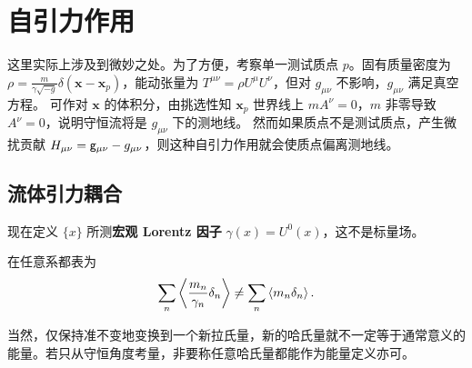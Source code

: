 \chapter{自引力作用}
这里实际上涉及到微妙之处。为了方便，考察单一测试质点 $p$。固有质量密度为 $\rho=\frac{m}{\gamma\sqrt{-g}}\delta(\bm x-\bm x_p)$，能动张量为 $T^{\mu\nu}=\rho U^\mu U^\nu$，但对 $g_{\mu\nu}$ 不影响，$g_{\mu\nu}$ 满足真空方程。
可作对 $\bm x$ 的体积分，由挑选性知 $\bm x_p$ 世界线上 $m A^\nu=0$，$m$ 非零导致 $A^\nu=0$，说明守恒流将是 $g_{\mu\nu}$ 下的测地线。
然而如果质点不是测试质点，产生微扰贡献 $H_{\mu\nu}=\mathsf{g}_{\mu\nu}- g_{\mu\nu}$，则这种自引力作用就会使质点偏离测地线。

\section{流体引力耦合}

现在定义 $\{x\}$ 所测\textbf{宏观 Lorentz 因子} $\gamma(x) = U^0(x)$，这不是标量场。

在任意系都表为
\[
    \sum_n\ev{\frac{m_n}{\gamma_n}\delta_n} \ne \sum_n\ev{m_n\delta_n}.
\]



当然，仅保持准不变地变换到一个新拉氏量，新的哈氏量就不一定等于通常意义的能量。若只从守恒角度考量，非要称任意哈氏量都能作为能量定义亦可。
